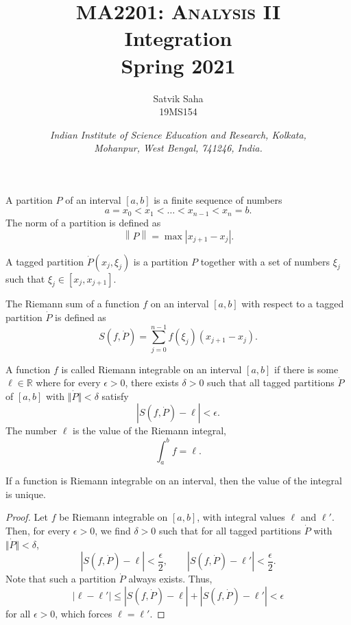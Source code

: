 \documentclass[11pt]{article}
\title{
    \Large\textsc{MA2201: Analysis II} \\
    \Huge \textbf{Integration} \\
    \vspace{5pt}
    \Large{Spring 2021}
}
\author{
    \large Satvik Saha%
    \\\textsc{\small 19MS154}
}
\date{\normalsize
    \textit{Indian Institute of Science Education and Research, Kolkata, \\
    Mohanpur, West Bengal, 741246, India.} \\
}
\def\R{\mathbb{R}}
\newcommand\norm[1]{\left\lVert#1\right\rVert}
\theoremstyle{definition}
\theoremstyle{remark}
\numberwithin{equation}{module}
\begin{document}
    \maketitle

    \begin{definition}[Partition]
        A partition $P$ of an interval $[a, b]$ is a finite sequence of numbers \[
            a = x_0 < x_1 < \dots < x_{n - 1} < x_n = b.
        \] The norm of a partition is defined as \[
            \norm{P} = \max |x_{j + 1} - x_j|.
        \] 
    \end{definition}
    
    \begin{definition}
        A tagged partition $\dot{P}(x_j, \xi_j)$ is a partition $P$ together with a set of
        numbers $\xi_j$ such that $\xi_j \in [x_j, x_{j + 1}]$.
    \end{definition}

    \begin{definition}
        The Riemann sum of a function $f$ on an interval $[a, b]$ with respect to a
        tagged partition $\dot{P}$ is defined as \[
            S(f, \dot{P}) = \sum_{j = 0}^{n - 1}  f(\xi_j)(x_{j + 1} - x_j). 
        \] 
    \end{definition}

    \begin{definition}
        A function $f$ is called Riemann integrable on an interval $[a, b]$ if 
        there is some $\ell \in \R$ where for every $\epsilon > 0$, there exists
        $\delta > 0$ such that all tagged partitions $\dot{P}$ of $[a, b]$ with
        $\Vert\dot{P}\Vert < \delta$ satisfy \[
            |S(f, \dot{P}) - \ell| < \epsilon.
        \] The number $\ell$ is the value of the Riemann integral, \[
            \int_a^b f = \ell.
        \] 
    \end{definition}

    \begin{theorem}
        If a function is Riemann integrable on an interval, then the value of the
        integral is unique.
    \end{theorem}
    \begin{proof}
        Let $f$ be Riemann integrable on $[a, b]$, with integral values $\ell$ and
        $\ell'$. Then, for every $\epsilon > 0$, we find $\delta > 0$ such that for
        all tagged partitions $\dot{P}$ with $\Vert\dot{P}\Vert < \delta$, \[
            |S(f, \dot{P}) - \ell| < \frac{\epsilon}{2}, \qquad
            |S(f, \dot{P}) - \ell'| < \frac{\epsilon}{2}.
        \] Note that such a partition $\dot{P}$ always exists. Thus, \[
            |\ell - \ell'| \leq |S(f, \dot{P}) - \ell| + |S(f, \dot{P}) - \ell'| <
            \epsilon
        \] for all $\epsilon > 0$, which forces $\ell = \ell'$.
    \end{proof}
\end{document}

